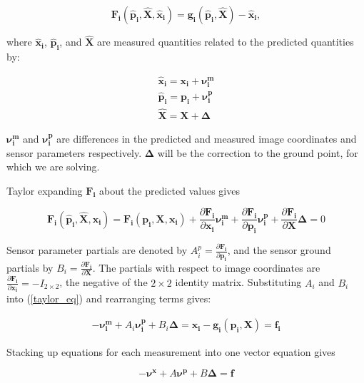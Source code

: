 \documentclass[10pt]{amsart}
\newcommand{\imgmeashat}{\pmb{\hat{x}_{i}}}
\newcommand{\imgmeas}{\pmb{x_{i}}}
\newcommand{\grndhat}{\pmb{\hat{X}}}
\newcommand{\grnd}{\pmb{X}}
\newcommand{\sensmeashat}{\pmb{\hat{p}_i}}
\newcommand{\sensmeas}{\pmb{p_i}}
\newcommand{\imgnu}{\pmb{\nu_{i}^m}}
\newcommand{\sensnu}{\pmb{\nu_i^p}}
\newcommand{\grndupdate}{\pmb{\Delta}}
\newcommand{\Fimgpartials}{\frac{\partial{\pmb{F_{i}}}}{\partial{\imgmeas}}}
\newcommand{\Fgrndpartials}{\frac{\partial{\pmb{F_{i}}}}{\partial{\grnd}}}
\newcommand{\Fsenspartials}{\frac{\partial{\pmb{F_{i}}}}{\partial{\sensmeas}}}
\begin{document}
\begin{equation*}
\pmb{F_{i}}(\sensmeashat, \grndhat,\imgmeashat)=\pmb{g_i}(\sensmeashat,\grndhat)-\imgmeashat,
\end{equation*}

where $\imgmeashat$, $\sensmeashat$, and $\grndhat$ are measured quantities
related to the predicted quantities by:

\begin{equation*}
\begin{split}
\imgmeashat = \imgmeas + \imgnu\\
\sensmeashat    = \sensmeas + \sensnu\\
\grndhat    = \grnd + \grndupdate
\end{split}
\end{equation*}

$\imgnu$ and $\sensnu$ are differences in the predicted and measured image
coordinates and sensor parameters respectively.  $\grndupdate$ will be the
correction to the ground point, for which we are solving.

Taylor expanding $\pmb{F_{i}}$ about the predicted values gives

\begin{equation} \label{taylor_eq}
\pmb{F_{i}}(\sensmeashat, \grndhat, \imgmeashat) = 
\pmb{F_{i}}(\sensmeas, \grnd, \imgmeas) + \Fimgpartials\imgnu + \Fsenspartials\sensnu + \Fgrndpartials\grndupdate = 0
\end{equation}

Sensor parameter partials are denoted by $A_{i}^p = \Fsenspartials$, and the
sensor ground partials by $B_{i} = \Fgrndpartials$.  The partials with respect
to image coordinates are ${\Fimgpartials=-I_{2 \times 2}}$, the negative of the
$2 \times 2$ identity matrix.  Substituting $A_{i}$ and $B_{i}$ into
(\ref{taylor_eq}) and rearranging terms gives:

\begin{equation} \label{linear_eq}
\begin{split}
-\imgnu + A_{i}\sensnu + B_{i}\grndupdate = \imgmeas - \pmb{g_i}(\sensmeas, \grnd) = \pmb{f_{i}}
\end{split}
\end{equation}

Stacking up equations for each measurement into one vector equation gives

\begin{equation}\label{stacked_eq}
-\pmb{\nu^x} + A\pmb{\nu^p} + B\grndupdate = \pmb{f}
\end{equation}
\end{document}
